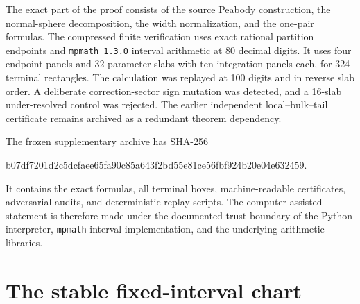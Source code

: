 \documentclass[11pt]{article}
\numberwithin{equation}{section}
\theoremstyle{remark}
\begin{document}
The exact part of the proof consists of the source Peabody construction, the normal-sphere decomposition, the width normalization, and the one-pair formulas. The compressed finite verification uses exact rational partition endpoints and \texttt{mpmath 1.3.0} interval arithmetic at 80 decimal digits. It uses four endpoint panels and 32 parameter slabs with ten integration panels each, for 324 terminal rectangles. The calculation was replayed at 100 digits and in reverse slab order. A deliberate correction-sector sign mutation was detected, and a 16-slab under-resolved control was rejected. The earlier independent local--bulk--tail certificate remains archived as a redundant theorem dependency.

The frozen supplementary archive \cite{SwihartPackage2026} has SHA-256
\begin{center}
\small\ttfamily
b07df7201d2c5dcfaee65fa90c85a643f2bd55e81ce56fbf924b20e04e632459.
\end{center}
It contains the exact formulas, all terminal boxes, machine-readable certificates, adversarial audits, and deterministic replay scripts. The computer-assisted statement is therefore made under the documented trust boundary of the Python interpreter, \texttt{mpmath} interval implementation, and the underlying arithmetic libraries.

\appendix

\section{The stable fixed-interval chart}
\label{app:q-chart}
\end{document}
